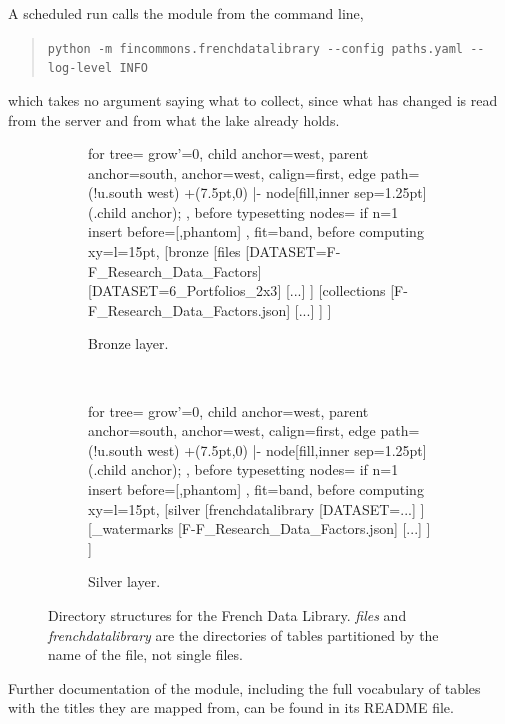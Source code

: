 A scheduled run calls the module from the command line,
\begin{quote}
\verb|python -m fincommons.frenchdatalibrary --config paths.yaml --log-level INFO|
\end{quote}
which takes no argument saying what to collect, since what has changed is read from the server and from what the lake already holds.

\begin{figure}[h!]
	\centering
	\begin{subfigure}[t]{.48\textwidth}
		\centering
		\begin{forest}
			for tree={
				grow'=0,
				child anchor=west,
				parent anchor=south,
				anchor=west,
				calign=first,
				edge path={
					\noexpand{}
					(!u.south west) +(7.5pt,0) |- node[fill,inner sep=1.25pt] {} (.child anchor);
				},
				before typesetting nodes={
					if n=1
					{insert before={[,phantom]}}
					{}
				},
				fit=band,
				before computing xy={l=15pt},
			}
			[bronze
				[files
					[{DATASET=F-F\_Research\_Data\_Factors}]
					[{DATASET=6\_Portfolios\_2x3}]
					[...]
				]
				[collections
					[F-F\_Research\_Data\_Factors.json]
					[...]
				]
			]
		\end{forest}
		\caption{Bronze layer.}
	\end{subfigure} %
	~
	\begin{subfigure}[t]{.48\textwidth}
		\centering
		\begin{forest}
			for tree={
				grow'=0,
				child anchor=west,
				parent anchor=south,
				anchor=west,
				calign=first,
				edge path={
					\noexpand{}
					(!u.south west) +(7.5pt,0) |- node[fill,inner sep=1.25pt] {} (.child anchor)\forestoption{edge label};
				},
				before typesetting nodes={
					if n=1
					{insert before={[,phantom]}}
					{}
				},
				fit=band,
				before computing xy={l=15pt},
			}
			[silver
				[frenchdatalibrary
					[{DATASET=...}]
				]
				[\_watermarks
					[F-F\_Research\_Data\_Factors.json]
					[...]
				]
			]
		\end{forest}
		\caption{Silver layer.}
	\end{subfigure}
	\caption{Directory structures for the French Data Library. \emph{files} and \emph{frenchdatalibrary} are the directories of tables partitioned by the name of the file, not single files.\label{fig:dirstruct_frenchdatalibrary}}
\end{figure}

Further documentation of the module, including the full vocabulary of tables with the titles they are mapped from, can be found in its README file.
